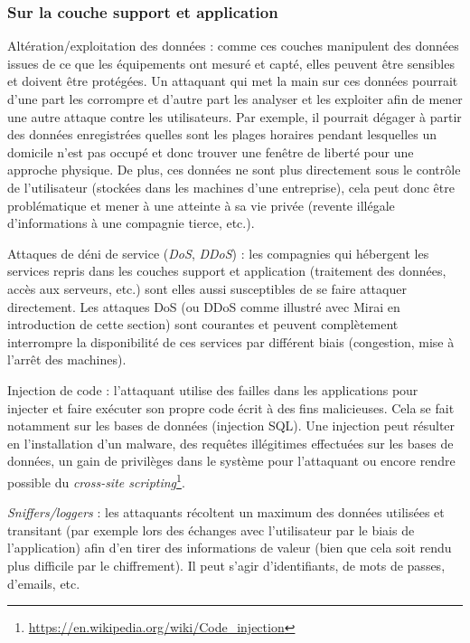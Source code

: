 \documentclass[]{article}
\begin{document}
\subsubsection{Sur la couche support et application}

\par Altération/exploitation des données : comme ces couches manipulent des données issues de ce que les équipements ont mesuré et capté, elles peuvent être sensibles et doivent être protégées. Un attaquant qui met la main sur ces données pourrait d'une part les corrompre et d'autre part les analyser et les exploiter afin de mener une autre attaque contre les utilisateurs. Par exemple, il pourrait dégager à partir des données enregistrées quelles sont les plages horaires pendant lesquelles un domicile n'est pas occupé et donc trouver une fenêtre de liberté pour une approche physique. De plus,  ces données ne sont plus directement sous le contrôle de l'utilisateur (stockées dans les machines d'une entreprise), cela peut donc être problématique et mener à une atteinte à sa vie privée (revente  illégale d'informations à une compagnie tierce, etc.).\\

\par Attaques de déni de service (\textit{DoS}, \textit{DDoS}) : les compagnies qui hébergent les services repris dans les couches support et application (traitement des données, accès aux serveurs, etc.) sont elles aussi susceptibles de se faire attaquer directement. Les attaques DoS (ou DDoS comme illustré avec Mirai en introduction de cette section) sont courantes et peuvent complètement interrompre la disponibilité de ces services par différent biais (congestion, mise à l'arrêt des machines).\\

\par Injection de code : l'attaquant utilise des failles dans les applications pour injecter et faire exécuter son propre code écrit à des fins malicieuses. Cela se fait notamment sur les bases de données (injection SQL). Une injection peut résulter en l'installation d'un malware, des requêtes illégitimes effectuées sur les bases de données, un gain de privilèges dans le système pour l'attaquant ou encore rendre possible du \textit{cross-site scripting}\footnote{\url{https://en.wikipedia.org/wiki/Code_injection}}.\\

\par \textit{Sniffers/loggers} : les attaquants récoltent un maximum des données utilisées et transitant (par exemple lors des échanges avec l'utilisateur par le biais de l'application) afin d'en tirer des informations de valeur (bien que cela soit rendu plus difficile par le chiffrement). Il peut s'agir d'identifiants, de mots de passes, d'emails, etc.\\
\end{document}
